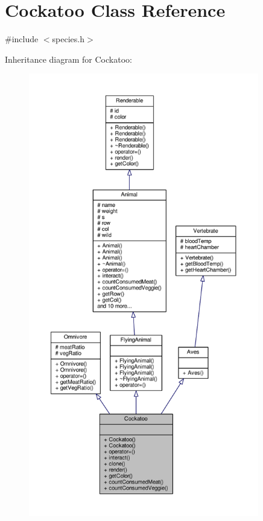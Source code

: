 \hypertarget{classCockatoo}{}\section{Cockatoo Class Reference}
\label{classCockatoo}


{\ttfamily \#include $<$species.\+h$>$}



Inheritance diagram for Cockatoo\+:
\nopagebreak
\begin{figure}[H]
\begin{center}
\leavevmode
\includegraphics[height=550pt]{classCockatoo__inherit__graph}
\end{center}
\end{figure}


